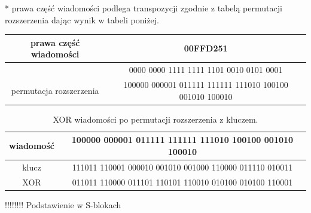 \documentclass[12p]{article}
\begin{document}
* prawa część wiadomości podlega transpozycji zgodnie z tabelą permutacji rozszerzenia dając wynik w tabeli poniżej.
\begin{table}[!h]
\begin{tabular}{|c|c|}
\hline
prawa część wiadomości & 00FFD251\\ \hline
& 0000 0000 1111 1111 1101 0010 0101 0001\\ \hline
permutacja rozszerzenia & 100000 000001 011111 111111 111010 100100 001010 100010\\ \hline
\end{tabular}
\end{table}


\begin{table}[!h]
\begin{tabular}{|c|c|}
\hline
wiadomość & 100000 000001 011111 111111 111010 100100 001010 100010\\ \hline
klucz & 111011 110001 000010 001010 001000 110000 011110 010011\\ \hline
XOR & 011011 110000 011101 110101 110010 010100 010100 110001\\ 
\hline
\end{tabular}
\caption{XOR wiadomości po permutacji rozszerzenia z kluczem.}\label{xor}
\end{table}

!!!!!!!! Podstawienie w S-blokach
\end{document}
